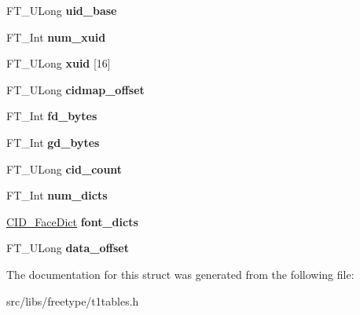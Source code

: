 \begin{DoxyCompactItemize}
\item 
\hypertarget{struct_c_i_d___face_info_rec___a1fae2d9b863a9e27089894789ab4413e}{
FT\_\-ULong {\bfseries uid\_\-base}}
\label{struct_c_i_d___face_info_rec___a1fae2d9b863a9e27089894789ab4413e}

\item 
\hypertarget{struct_c_i_d___face_info_rec___ab7dc17fbfc7926996832513266e88623}{
FT\_\-Int {\bfseries num\_\-xuid}}
\label{struct_c_i_d___face_info_rec___ab7dc17fbfc7926996832513266e88623}

\item 
\hypertarget{struct_c_i_d___face_info_rec___a32cd8836dd8a395d9aa6fb5831f06b27}{
FT\_\-ULong {\bfseries xuid} \mbox{[}16\mbox{]}}
\label{struct_c_i_d___face_info_rec___a32cd8836dd8a395d9aa6fb5831f06b27}

\item 
\hypertarget{struct_c_i_d___face_info_rec___a8c72c1a90704c7e3519ca182613fec5a}{
FT\_\-ULong {\bfseries cidmap\_\-offset}}
\label{struct_c_i_d___face_info_rec___a8c72c1a90704c7e3519ca182613fec5a}

\item 
\hypertarget{struct_c_i_d___face_info_rec___a72944c0b4e85dba619adaf114ff7a8b1}{
FT\_\-Int {\bfseries fd\_\-bytes}}
\label{struct_c_i_d___face_info_rec___a72944c0b4e85dba619adaf114ff7a8b1}

\item 
\hypertarget{struct_c_i_d___face_info_rec___a4f1caffd756d0daebbc69af0dcdd74a0}{
FT\_\-Int {\bfseries gd\_\-bytes}}
\label{struct_c_i_d___face_info_rec___a4f1caffd756d0daebbc69af0dcdd74a0}

\item 
\hypertarget{struct_c_i_d___face_info_rec___a5eae3fdfaded7bdef4e0bd027ecba595}{
FT\_\-ULong {\bfseries cid\_\-count}}
\label{struct_c_i_d___face_info_rec___a5eae3fdfaded7bdef4e0bd027ecba595}

\item 
\hypertarget{struct_c_i_d___face_info_rec___a3b53b4e162a3c1434c6b91334aa69041}{
FT\_\-Int {\bfseries num\_\-dicts}}
\label{struct_c_i_d___face_info_rec___a3b53b4e162a3c1434c6b91334aa69041}

\item 
\hypertarget{struct_c_i_d___face_info_rec___a821a773b846c837338d1c03984e5e7d5}{
\hyperlink{struct_c_i_d___face_dict_rec__}{CID\_\-FaceDict} {\bfseries font\_\-dicts}}
\label{struct_c_i_d___face_info_rec___a821a773b846c837338d1c03984e5e7d5}

\item 
\hypertarget{struct_c_i_d___face_info_rec___a31e8fb9ac2b0c1fa63220e5e07aeea97}{
FT\_\-ULong {\bfseries data\_\-offset}}
\label{struct_c_i_d___face_info_rec___a31e8fb9ac2b0c1fa63220e5e07aeea97}

\end{DoxyCompactItemize}


The documentation for this struct was generated from the following file:\begin{DoxyCompactItemize}
\item 
src/libs/freetype/t1tables.h\end{DoxyCompactItemize}
